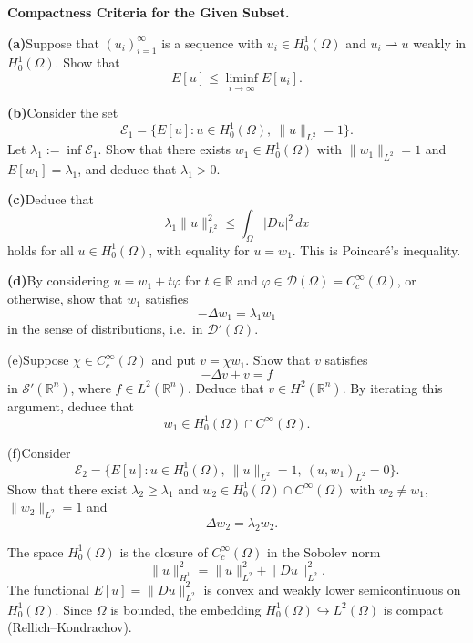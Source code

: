\begin{problem}[CP-II-0229]
\label{prob:cp-ii-0229}
\textbf{Compactness Criteria for the Given Subset.}

\par\smallskip\hspace*{1.5em}\textbf{(a)}\quad Suppose that $(u_i)_{i=1}^\infty$ is a sequence with
	$u_i\in H_0^1(\Omega)$ and $u_i\rightharpoonup u$ weakly in $H_0^1(\Omega)$.
	Show that
	\[
	E[u]\le \liminf_{i\to\infty}E[u_i].
	\]

	\par\smallskip\noindent\textbf{(b)}\quad Consider the set
	\[
	\mathcal{E}_1=\{E[u]:u\in H_0^1(\Omega),\ \|u\|_{L^2}=1\}.
	\]
	Let $\lambda_1:=\inf\mathcal{E}_1$. Show that there exists
	$w_1\in H_0^1(\Omega)$ with $\|w_1\|_{L^2}=1$ and $E[w_1]=\lambda_1$, and
	deduce that $\lambda_1>0$.

	\par\smallskip\noindent\textbf{(c)}\quad Deduce that
	\[
	\lambda_1\|u\|_{L^2}^2\le \int_\Omega |Du|^2\,dx
	\]
	holds for all $u\in H_0^1(\Omega)$, with equality for $u=w_1$.
	This is Poincar\'e's inequality.

	\par\smallskip\noindent\textbf{(d)}\quad By considering $u=w_1+t\varphi$ for $t\in\mathbb{R}$ and
	$\varphi\in\mathcal{D}(\Omega)=C_c^\infty(\Omega)$, or otherwise,
	show that $w_1$ satisfies
	\[
	-\Delta w_1=\lambda_1 w_1
	\]
	in the sense of distributions, i.e.\ in $\mathcal{D}'(\Omega)$.

	\par\noindent \textnormal{(e)}\quad Suppose $\chi\in C_c^\infty(\Omega)$ and put $v=\chi w_1$.
	Show that $v$ satisfies
	\[
	-\Delta v + v = f
	\]
	in $\mathcal{S}'(\mathbb{R}^n)$, where $f\in L^2(\mathbb{R}^n)$.
	Deduce that $v\in H^2(\mathbb{R}^n)$. By iterating this argument, deduce that
	\[
	w_1\in H_0^1(\Omega)\cap C^\infty(\Omega).
	\]

	\par\noindent \textnormal{(f)}\quad Consider
	\[
	\mathcal{E}_2=\{E[u]:u\in H_0^1(\Omega),\ \|u\|_{L^2}=1,\ (u,w_1)_{L^2}=0\}.
	\]
	Show that there exist $\lambda_2\ge\lambda_1$ and
	$w_2\in H_0^1(\Omega)\cap C^\infty(\Omega)$ with
	$w_2\neq w_1$, $\|w_2\|_{L^2}=1$ and
	\[
	-\Delta w_2=\lambda_2 w_2.
	\]

The space $H_0^1(\Omega)$ is the closure of $C_c^\infty(\Omega)$ in the
Sobolev norm
\[
\|u\|_{H^1}^2=\|u\|_{L^2}^2+\|Du\|_{L^2}^2.
\]
The functional $E[u]=\|Du\|_{L^2}^2$ is convex and weakly lower semicontinuous
on $H_0^1(\Omega)$. Since $\Omega$ is bounded, the embedding
$H_0^1(\Omega)\hookrightarrow L^2(\Omega)$ is compact (Rellich--Kondrachov).


\end{problem}

